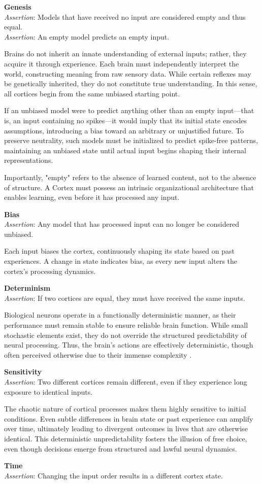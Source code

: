 \documentclass{article}
\newcommand{\agitbtest}[2]{
  \item
  \begin{minipage}[t]{\linewidth}
    \textbf{#1} \\[0.5ex]
    #2
  \end{minipage}
}
\begin{document}
\begin{agitblist}
\agitbtest{Genesis}{
\emph{Assertion}: Models that have received no input are considered empty and thus equal.\\
\emph{Assertion}: An empty model predicts an empty input.

Brains do not inherit an innate understanding of external inputs; rather, they acquire it through experience. Each brain must independently interpret the world, constructing meaning from raw sensory data. While certain reflexes may be genetically inherited, they do not constitute true understanding. In this sense, all cortices begin from the same unbiased starting point.

If an unbiased model were to predict anything other than an empty input—that is, an input containing no spikes—it would imply that its initial state encodes assumptions, introducing a bias toward an arbitrary or unjustified future. To preserve neutrality, such models must be initialized to predict spike-free patterns, maintaining an unbiased state until actual input begins shaping their internal representations.

Importantly, "empty" refers to the absence of learned content, not to the absence of structure. A Cortex must possess an intrinsic organizational architecture that enables learning, even before it has processed any input.
}
\agitbtest{Bias}{
\emph{Assertion}: Any model that has processed input can no longer be considered unbiased.

Each input biases the cortex, continuously shaping its state based on past experiences. A change in state indicates bias, as every new input alters the cortex's processing dynamics.
}
\agitbtest{Determinism}{
\emph{Assertion}: If two cortices are equal, they must have received the same inputs.

Biological neurons operate in a functionally deterministic manner, as their performance must remain stable to ensure reliable brain function. While small stochastic elements exist, they do not override the structured predictability of neural processing. Thus, the brain's actions are effectively deterministic, though often perceived otherwise due to their immense complexity \cite{AtlanticFreeWill}.
}
\agitbtest{Sensitivity}{
\emph{Assertion}: Two different cortices remain different, even if they experience long exposure to identical inputs.

The chaotic nature of cortical processes makes them highly sensitive to initial conditions. Even subtle differences in brain state or past experience can amplify over time, ultimately leading to divergent outcomes in lives that are otherwise identical. This deterministic unpredictability fosters the illusion of free choice, even though decisions emerge from structured and lawful neural dynamics.
}
\agitbtest{Time}{
\emph{Assertion}: Changing the input order results in a different cortex state.

}
\end{agitblist}
\end{document}
